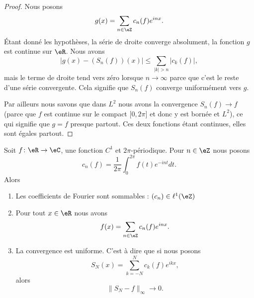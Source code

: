 \begin{proof}
	Nous posons
	\begin{equation}
		g(x)=\sum_{n\in \eZ}c_n(f) e^{inx}.
	\end{equation}
	Étant donné les hypothèses, la série de droite converge absolument, la fonction \( g\) est continue sur \( \eR\). Nous avons
	\begin{equation}
		\big| g(x)-(S_n(f))(x) \big|\leq \sum_{| k |> n}| c_k(f) |,
	\end{equation}
	mais le terme de droite tend vers zéro lorsque \( n\to \infty\) parce que c'est le reste d'une série convergente. Cela signifie que \( S_n(f)\) converge uniformément vers \( g\).

	Par ailleurs nous savons que dans \( L^2\) nous avons la convergence \( S_n(f)\to f\) (parce que \( f\) est continue sur le compact \( \mathopen[ 0 , 2\pi \mathclose]\) et donc y est bornée et \( L^2\)), ce qui signifie que \( g=f\) presque partout. Ces deux fonctions étant continues, elles sont égales partout.
\end{proof}

\begin{theorem}     \label{ThozHXraQ}
	Soit \( f\colon \eR\to \eC\), une fonction \( C^1\) et \( 2\pi\)-périodique. Pour \( n\in \eZ\) nous posons
	\begin{equation}
		c_n(f)=\frac{1}{ 2\pi }\int_0^{2\pi}f(t) e^{-int}dt.
	\end{equation}
	Alors
	\begin{enumerate}
		\item       \label{ITEMooIDVEooJdMEmU}
		      Les coefficients de Fourier sont sommables : \( (c_n)\in \ell^1(\eZ)\)
		\item       \label{ITEMooGIEUooKLyXej}
		      Pour tout \( x\in \eR\) nous avons
		      \begin{equation}
			      f(x)=\sum_{n\in \eZ}c_n(f) e^{inx}.
		      \end{equation}
		\item       \label{ITEMooAUCTooTgJEPv}
		      La convergence est uniforme. C'est à dire que si nous posons
		      \begin{equation}
			      S_N(x)=\sum_{k=-N}^Nc_k(f) e^{ikx},
		      \end{equation}
		      alors
		      \begin{equation}
			      \| S_N-f \|_{\infty}\to 0.
		      \end{equation}
	\end{enumerate}
\end{theorem}

